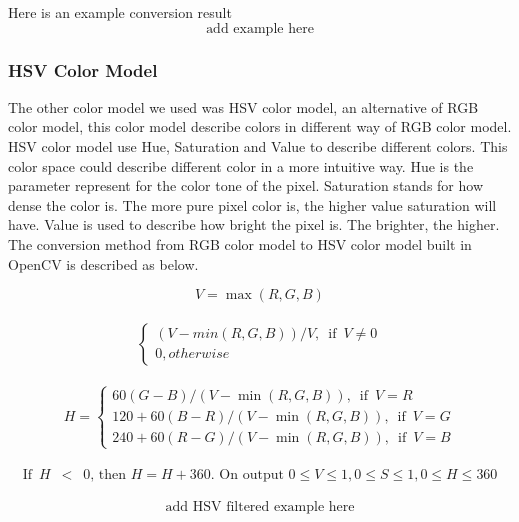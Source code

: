             Here is an example conversion result
            $$ \textrm{add example here} $$
        \subsubsection{HSV Color Model}
            The other color model we used was HSV color model, an alternative of RGB color model, this color model describe colors in different way of RGB color model.
            HSV color model use Hue, Saturation and Value to describe different colors.
            This color space could describe different color in a more intuitive way.
            Hue is the parameter represent for the color tone of the pixel. %
            Saturation stands for how dense the color is. The more pure pixel color is, the higher value saturation will have.
            Value is used to describe how bright the pixel is. The brighter, the higher.
            The conversion method from RGB color model to HSV color model built in OpenCV is described as below.

            $$
                V = \max(R,G,B)
            $$\\
            $$
                \begin{cases}   
                    {{{(V-min(R,G,B))}/{V}}, \enspace\textrm{if}\enspace V \neq 0}\\
                    {0, otherwise}
                \end{cases}
            $$\\
            $$
                H =
                \begin{cases} 
                    {{60(G - B)}/{(V-\min(R,G,B))}, \enspace\textrm{if}\enspace V=R}\\
                    {{120+60(B - R)}/{(V-\min(R,G,B))}, \enspace\textrm{if}\enspace V=G}\\
                    {{240+60(R - G)}/{(V-\min(R,G,B))}, \enspace\textrm{if}\enspace V=B}
                \end{cases}
            $$\\
            $$
                \textrm{If} \enspace H \enspace < \enspace 0 \textrm{, then } H = H + 360. \textrm{ On output } 0 \leq V \leq 1, 0 \leq S \leq 1, 0 \leq H \leq 360
            $$\\
            $$ \textrm{add HSV filtered example here} $$

